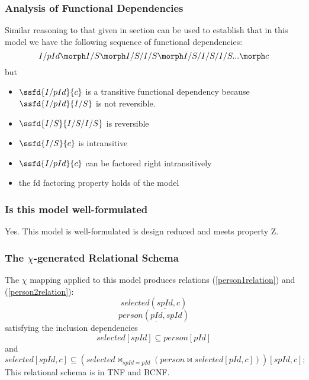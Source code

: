 \subsubsection{Analysis of Functional Dependencies}
 


Similar reasoning to that given in section  can be used to establish that 
in this model we have the following sequence of functional dependencies:
\begin{equation}
I/pId \morph I/S \morph I/S/I/S \morph I/S/I/S/I/S ... \morph c
\end{equation}
but 
\begin{itemize}
\item $\ssfd{I/pId}{c}$ is a transitive functional dependency because $\ssfd{I/pId}{I/S}$ is not reversible.
\item $\ssfd{I/S}{I/S/I/S}$ is reversible 
\item $\ssfd{I/S}{c}$ is intransitive
\item $\ssfd{I/pId}{c}$ can be factored right intransitively
\item the fd factoring property holds of the model
\end{itemize}

\subsubsection{Is this model well-formulated}
Yes. This model is well-formulated is design reduced and meets property Z. 


\subsubsection{The $\chi$-generated Relational Schema}
The $\chi$ mapping applied to this model produces relations (\ref{person1relation}) and (\ref{person2relation}):
\begin{equation}
\label{person1relation}
selected(\underline{spId},  c)
\end{equation}
\begin{equation}
\label{person2relation}
person(\underline{pId}, spId)
\end{equation}
satisfying the inclusion dependencies
\begin{equation}
selected[spId] \subseteq person[pId]
\end{equation}
and
\begin{equation}
\label{spIdselectedcolour}
selected[spId,c] \subseteq (selected \bowtie_{spId=pId} 
                                       (person \bowtie selected [pId,c]) )
																			[spId,c];
\end{equation}
This relational schema is in TNF and BCNF.


